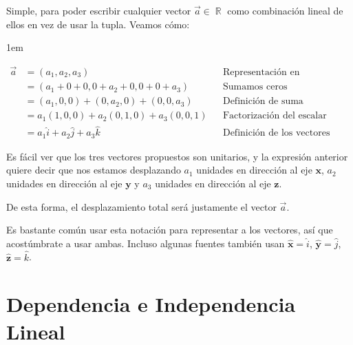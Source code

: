 \documentclass[12pt, fleqn]{report}                             %
\newenvironment{SmallIndentation}[1][0.75em]                    %
        {\begin{adjustwidth}{#1}{}\begin{footnotesize}}             %
        {\end{footnotesize}\end{adjustwidth}}                       %
\theoremstyle{break}                                            %
\DeclareMathOperator \Reals        {\mathbb{R}}                 %
\newcommand{\uVec}[1]{\mathbf{\hat{#1}}}                        %
\begin{document}
                    Simple, para poder escribir cualquier vector $\vec{a} \in \Reals$ como combinación
                    lineal de ellos en vez de usar la tupla.
                    Veamos cómo:
                    \begin{SmallIndentation}[1em]
                        \begin{align*}
                            \vec{a}
                                &= (a_1, a_2, a_3)                               &&\mbox{Representación en coordenadas}        \\
                                &= (a_1 + 0 + 0, 0 + a_2 + 0, 0 + 0 + a_3)       &&\mbox{Sumamos ceros convenientemente}       \\
                                &= (a_1, 0, 0) + (0, a_2, 0) + (0, 0, a_3)       &&\mbox{Definición de suma}                   \\
                                &= a_1(1, 0, 0) + a_2(0, 1, 0) + a_3(0, 0, 1)    &&\mbox{Factorización del escalar}            \\
                                &= a_1\hat{i} + a_2\hat{j} + a_3\hat{k}          &&\mbox{Definición de los vectores canónicos}
                        \end{align*}
                    \end{SmallIndentation}
                
                    Es fácil ver que los tres vectores propuestos son unitarios, y la expresión anterior
                    quiere decir que nos estamos desplazando $a_1$ unidades en dirección al eje $\mathbf{x}$,
                    $a_2$ unidades en dirección al eje $\mathbf{y}$ y $a_3$ unidades en dirección al eje
                    $\mathbf{z}$.

                    De esta forma, el desplazamiento total será justamente el vector $\vec{a}$.
                    
                    Es bastante común usar esta notación para representar a los vectores, así que acostúmbrate a usar ambas. 
                    Incluso algunas fuentes también usan $\uVec{x} = \hat{i}$, $\uVec{y} = \hat{j}$, $\uVec{z} = \hat{k}$.



        \clearpage
        \section{Dependencia e Independencia Lineal}
            
\end{document}
